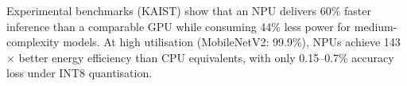 Experimental benchmarks (KAIST) show that an NPU delivers 60\% faster
inference than a comparable GPU while consuming 44\% less power for
medium-complexity models. At high utilisation (MobileNetV2: 99.9\%), NPUs
achieve 143$\times$ better energy efficiency than CPU equivalents, with
only 0.15–0.7\% accuracy loss under INT8 quantisation.
